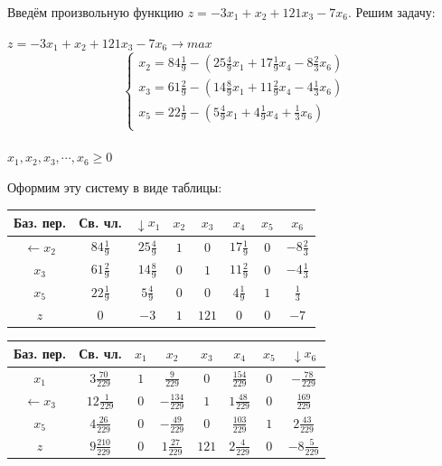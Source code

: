 \documentclass[a4paper,14pt]{extarticle}
\begin{document}
Введём произвольную функцию $z = -3x_1 + x_2 + 121x_3 - 7x_6$. Решим задачу:
\begin{center}
    $z = -3x_1 + x_2 + 121x_3 - 7x_6 \rightarrow max$\\
    \begin{equation*}
        \begin{cases}
            x_2 = 84\frac{1}{9} - (25\frac{4}{9}x_1 + 17\frac{1}{9}x_4 - 8\frac{2}{3}x_6) \\
            x_3 = 61\frac{2}{9} - (14\frac{8}{9}x_1 + 11\frac{2}{9}x_4 -4\frac{1}{3}x_6)  \\
            x_5 = 22\frac{1}{9} - (5\frac{4}{9}x_1 + 4\frac{1}{9}x_4 + \frac{1}{3}x_6)    \\
        \end{cases}
    \end{equation*}\\
    $x_1, x_2, x_3, \dotsb, x_6 \geq 0$
\end{center}
Оформим эту систему в виде таблицы:\\
\begin{tabular}{|c|c|c|c|c|c|c|c|}
    \hline
    Баз. пер.        & Св. чл.         & $\downarrow x_1$ & $x_2$ & $x_3$ & $x_4$           & $x_5$ & $x_6$            \\
    \hline
    $\leftarrow x_2$ & $84\frac{1}{9}$ & $25\frac{4}{9}$  & $1$   & $0$   & $17\frac{1}{9}$ & $0$   & $- 8\frac{2}{3}$ \\
    \hline
    $x_3$            & $61\frac{2}{9}$ & $14\frac{8}{9}$  & $0$   & $1$   & $11\frac{2}{9}$ & $0$   & $-4\frac{1}{3}$  \\
    \hline
    $x_5$            & $22\frac{1}{9}$ & $5\frac{4}{9}$   & $0$   & $0$   & $4\frac{1}{9}$  & $1$   & $\frac{1}{3}$    \\
    \hline
    $z$              & $0$             & $-3$             & $1$   & $121$ & $0$             & $0$   & $-7$             \\
    \hline
\end{tabular}\bigbreak
\begin{tabular}{|c|c|c|c|c|c|c|c|}
    \hline
    Баз. пер.        & Св. чл.            & $x_1$ & $x_2$              & $x_3$ & $x_4$             & $x_5$ & $\downarrow x_6$   \\
    \hline
    $x_1$            & $ 3\frac{70}{229}$ & $1$   & $\frac{9}{229}$    & $0$   & $\frac{154}{229}$ & $0$   & $- \frac{78}{229}$ \\
    \hline
    $\leftarrow x_3$ & $12\frac{1}{229}$  & $0$   & $-\frac{134}{229}$ & $1$   & $1\frac{48}{229}$ & $0$   & $\frac{169}{229}$  \\
    \hline
    $x_5$            & $4\frac{26}{229}$  & $0$   & $-\frac{49}{229}$  & $0$   & $\frac{103}{229}$ & $1$   & $2\frac{43}{229}$  \\
    \hline
    $z$              & $9\frac{210}{229}$ & $0$   & $1\frac{27}{229}$  & $121$ & $2\frac{4}{229}$  & $0$   & $-8\frac{5}{229}$  \\
    \hline
\end{tabular}\bigbreak
\end{document}
